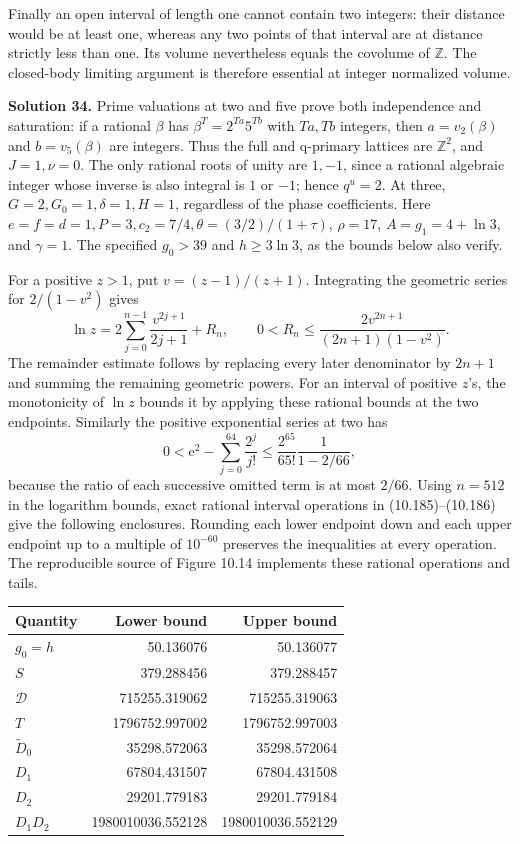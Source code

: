 \documentclass[
  11pt,
  a4paper,
]{article}
\newcounter{none} %
\begin{document}
Finally an open interval of length one cannot contain two integers:
their distance would be at least one, whereas any two points of that
interval are at distance strictly less than one. Its volume nevertheless
equals the covolume of \(\mathbb Z\). The closed-body limiting argument
is therefore essential at integer normalized volume.

\textbf{Solution 34.} Prime valuations at two and five prove both
independence and saturation: if a rational \(\beta\) has
\(\beta^T=2^{Ta}5^{Tb}\) with \(Ta,Tb\) integers, then \(a=v_2(\beta)\)
and \(b=v_5(\beta)\) are integers. Thus the full and q-primary lattices
are \(\mathbb Z^2\), and \(J=1,\nu=0\). The only rational roots of unity
are \(1,-1\), since a rational algebraic integer whose inverse is also
integral is \(1\) or \(-1\); hence \(q^u=2\). At three,
\(G=2,G_0=1,\delta=1,H=1\), regardless of the phase coefficients. Here
\(e=f=d=1,P=3,c_2=7/4,\theta=(3/2)/(1+\tau)\), \(\rho=17\),
\(A=g_1=4+\ln3\), and \(\gamma=1\). The specified \(g_0>39\) and
\(h\ge3\ln3\), as the bounds below also verify.

For a positive \(z>1\), put \(v=(z-1)/(z+1)\). Integrating the geometric
series for \(2/(1-v^2)\) gives \[
\ln z=2\sum_{j=0}^{n-1}\frac{v^{2j+1}}{2j+1}+R_n,\qquad
0<R_n\le\frac{2v^{2n+1}}{(2n+1)(1-v^2)}.
\] The remainder estimate follows by replacing every later denominator
by \(2n+1\) and summing the remaining geometric powers. For an interval
of positive \(z\)'s, the monotonicity of \(\ln z\) bounds it by applying
these rational bounds at the two endpoints. Similarly the positive
exponential series at two has \[
0<\mathrm e^2-\sum_{j=0}^{64}\frac{2^j}{j!}
\le\frac{2^{65}}{65!}\frac1{1-2/66},
\] because the ratio of each successive omitted term is at most
\(2/66\). Using \(n=512\) in the logarithm bounds, exact rational
interval operations in (10.185)--(10.186) give the following enclosures.
Rounding each lower endpoint down and each upper endpoint up to a
multiple of \(10^{-60}\) preserves the inequalities at every operation.
The reproducible source of Figure 10.14 implements these rational
operations and tails.

{\def\LTcaptype{none} %
\begin{longtable}[]{@{}lrr@{}}
\toprule\noalign{}
Quantity & Lower bound & Upper bound \\
\midrule\noalign{}
\endhead
\bottomrule\noalign{}
\endlastfoot
\(g_0=h\) & 50.136076 & 50.136077 \\
\(S\) & 379.288456 & 379.288457 \\
\(\mathcal D\) & 715255.319062 & 715255.319063 \\
\(T\) & 1796752.997002 & 1796752.997003 \\
\(\widetilde D_0\) & 35298.572063 & 35298.572064 \\
\(D_1\) & 67804.431507 & 67804.431508 \\
\(D_2\) & 29201.779183 & 29201.779184 \\
\(D_1D_2\) & 1980010036.552128 & 1980010036.552129 \\
\end{longtable}
}
\end{document}
